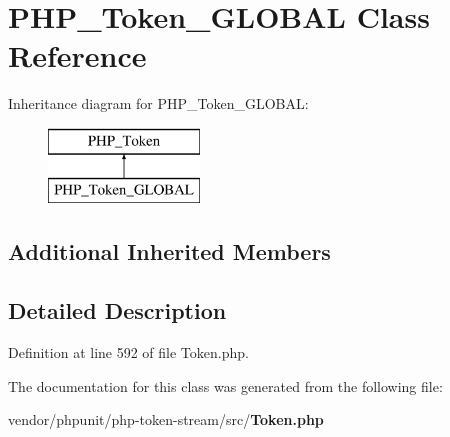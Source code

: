 \section{P\+H\+P\+\_\+\+Token\+\_\+\+G\+L\+O\+B\+A\+L Class Reference}
\label{class_p_h_p___token___g_l_o_b_a_l}
Inheritance diagram for P\+H\+P\+\_\+\+Token\+\_\+\+G\+L\+O\+B\+A\+L\+:\begin{figure}[H]
\begin{center}
\leavevmode
\includegraphics[height=2.000000cm]{class_p_h_p___token___g_l_o_b_a_l}
\end{center}
\end{figure}
\subsection*{Additional Inherited Members}


\subsection{Detailed Description}


Definition at line 592 of file Token.\+php.



The documentation for this class was generated from the following file\+:\begin{DoxyCompactItemize}
\item 
vendor/phpunit/php-\/token-\/stream/src/{\bf Token.\+php}\end{DoxyCompactItemize}
